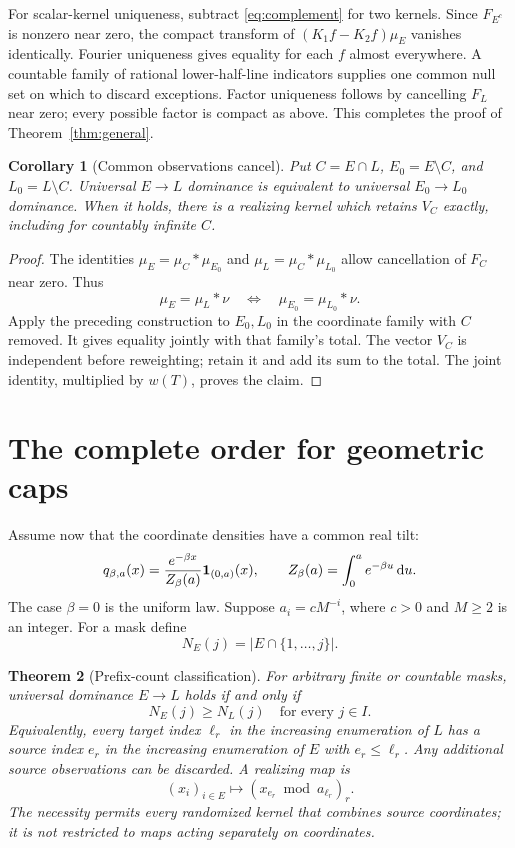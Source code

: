 \documentclass[11pt,a4paper]{article}
\newtheorem{theorem}{Theorem}[section]\newtheorem{lemma}[theorem]{Lemma}
\newtheorem{corollary}[theorem]{Corollary}\newtheorem{proposition}[theorem]{Proposition}
\theoremstyle{remark}\newtheorem*{ednote}{Editorial note (ProveIt, 2026-10-01)}
\newcommand{\dd}{\,\mathrm d}\newcommand{\ii}{\mathrm i}
\begin{document}
For scalar-kernel uniqueness, subtract \eqref{eq:complement} for two kernels. Since $F_{E^c}$ is nonzero near zero, the compact transform of $(K_1f-K_2f)\mu_E$ vanishes identically. Fourier uniqueness gives equality for each $f$ almost everywhere. A countable family of rational lower-half-line indicators supplies one common null set on which to discard exceptions. Factor uniqueness follows by cancelling $F_L$ near zero; every possible factor is compact as above. This completes the proof of Theorem~\ref{thm:general}.

\begin{corollary}[Common observations cancel]\label{cor:common}
Put $C=E\cap L$, $E_0=E\setminus C$, and $L_0=L\setminus C$. Universal $E\to L$ dominance is equivalent to universal $E_0\to L_0$ dominance. When it holds, there is a realizing kernel which retains $V_C$ exactly, including for countably infinite $C$.
\end{corollary}
\begin{proof}
The identities $\mu_E=\mu_C*\mu_{E_0}$ and $\mu_L=\mu_C*\mu_{L_0}$ allow cancellation of $F_C$ near zero. Thus
\[
 \mu_E=\mu_L*\nu\quad\Longleftrightarrow\quad
 \mu_{E_0}=\mu_{L_0}*\nu.
\]
Apply the preceding construction to $E_0,L_0$ in the coordinate family with $C$ removed. It gives equality jointly with that family's total. The vector $V_C$ is independent before reweighting; retain it and add its sum to the total. The joint identity, multiplied by $w(T)$, proves the claim.
\end{proof}

\section{The complete order for geometric caps}
Assume now that the coordinate densities have a common real tilt:
\begin{equation}\label{eq:tilts}
 q_{\beta,a}(x)=\frac{e^{-\beta x}}{Z_\beta(a)}\ind_{(0,a)}(x),
 \qquad Z_\beta(a)=\int_0^a e^{-\beta u}\dd u.
\end{equation}
The case $\beta=0$ is the uniform law. Suppose $a_i=cM^{-i}$, where $c>0$ and $M\ge2$ is an integer. For a mask define
\[
 N_E(j)=|E\cap\{1,\ldots,j\}|.
\]

\begin{theorem}[Prefix-count classification]\label{thm:geometric}
For arbitrary finite or countable masks, universal dominance $E\to L$ holds if and only if
\begin{equation}\label{eq:prefix}
 N_E(j)\ge N_L(j)\quad\text{for every }j\in I.
\end{equation}
Equivalently, every target index $\ell_r$ in the increasing enumeration of $L$ has a source index $e_r$ in the increasing enumeration of $E$ with $e_r\le\ell_r$. Any additional source observations can be discarded. A realizing map is
\begin{equation}\label{eq:residues}
 (x_i)_{i\in E}\longmapsto
 (x_{e_r}\bmod a_{\ell_r})_{r}.
\end{equation}
The necessity permits every randomized kernel that combines source coordinates; it is not restricted to maps acting separately on coordinates.
\end{theorem}
\end{document}
